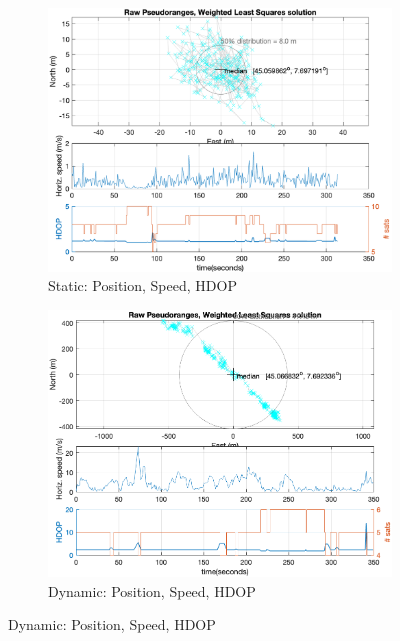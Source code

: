         \begin{figure}[h!]
            \centering
            \begin{subfigure}{0.23\textwidth}
                \includegraphics[width=\textwidth]{images/tests/Monte_Cappuccini/png/Samsung_A51_Monte_Cappuccini_fig4.png}
                \caption{Static: Position, Speed, HDOP}
            \end{subfigure}
            \hfill
            \begin{subfigure}{0.23\textwidth}
                \includegraphics[width=\textwidth]{images/tests/Tram_15_trip_Castello_to_Pescatore/filtered/Samsung_A51_Tram_15_trip_Castello_to_Pescatore_fig4.png}
                \caption{Dynamic: Position, Speed, HDOP}
            \end{subfigure}
        \end{figure}
    
